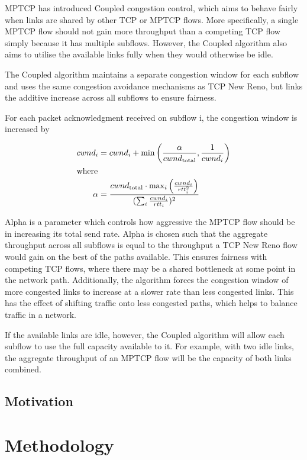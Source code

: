 \documentclass[12pt,a4paper]{article}
\begin{document}
MPTCP has introduced Coupled congestion control, which aims to behave fairly
when links are shared by other TCP or MPTCP flows. More specifically, a single
MPTCP flow should not gain more throughput than a competing TCP flow simply
because it has multiple subflows. However, the Coupled algorithm also aims to
utilise the available links fully when they would otherwise be idle.

The Coupled algorithm maintains a separate congestion window for each subflow
and uses the same congestion avoidance mechanisms as TCP New Reno, but links the
additive increase across all subflows to ensure fairness.

For each packet acknowledgment received on subflow i, the congestion window is
increased by

\begin{align*}
  cwnd_i &= cwnd_i +
    \min\left(\frac{\alpha}{cwnd_\text{total}}, \frac{1}{cwnd_i}\right) \\
  \intertext{where}
  \alpha &=
    \frac{cwnd_\text{total} \cdot \max_i\left(\frac{cwnd_i}{rtt_i^2}\right)}
         {(\sum_i \frac{cwnd_i}{rtt_i})^2}
\end{align*}

Alpha is a parameter which controls how aggressive the MPTCP flow should be in
increasing its total send rate. Alpha is chosen such that the aggregate
throughput across all subflows is equal to the throughput a TCP New Reno flow
would gain on the best of the paths available. This ensures fairness with
competing TCP flows, where there may be a shared bottleneck at some point in the
network path. Additionally, the algorithm forces the congestion window of more
congested links to increase at a slower rate than less congested links. This has
the effect of shifting traffic  onto less congested paths, which helps to
balance traffic in a network.

If the available links are idle, however, the Coupled algorithm will allow each
subflow to use the full capacity available to it. For example, with two idle
links, the aggregate throughput of an MPTCP flow will be the capacity of both
links combined.

\subsection{Motivation}

\section{Methodology}
\end{document}
